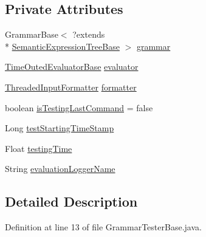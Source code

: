 \subsection*{Private Attributes}
\begin{DoxyCompactItemize}
\item 
Grammar\-Base$<$ ?extends \\*
\hyperlink{interfaceit_1_1emarolab_1_1cagg_1_1core_1_1evaluation_1_1semanticGrammar_1_1syntaxCompiler_1_1SemanticExpressionTreeBase}{Semantic\-Expression\-Tree\-Base} $>$ \hyperlink{classit_1_1emarolab_1_1cagg_1_1core_1_1evaluation_1_1interfacing_1_1GrammarTesterBase_ac6601808f37ef4327e6308143f01dc6a}{grammar}
\item 
\hyperlink{classit_1_1emarolab_1_1cagg_1_1core_1_1evaluation_1_1interfacing_1_1TimeOutedEvaluatorBase}{Time\-Outed\-Evaluator\-Base} \hyperlink{classit_1_1emarolab_1_1cagg_1_1core_1_1evaluation_1_1interfacing_1_1GrammarTesterBase_a51c86bbb5b066f7baeecea125a33f879}{evaluator}
\item 
\hyperlink{classit_1_1emarolab_1_1cagg_1_1core_1_1evaluation_1_1inputFormatting_1_1ThreadedInputFormatter}{Threaded\-Input\-Formatter} \hyperlink{classit_1_1emarolab_1_1cagg_1_1core_1_1evaluation_1_1interfacing_1_1GrammarTesterBase_a75f3a37db0c23ff1d1f29df7424fe9e4}{formatter}
\item 
boolean \hyperlink{classit_1_1emarolab_1_1cagg_1_1core_1_1evaluation_1_1interfacing_1_1GrammarTesterBase_ad1a8c5550fc3e8dd84d1d2360b85e624}{is\-Testing\-Last\-Command} = false
\item 
Long \hyperlink{classit_1_1emarolab_1_1cagg_1_1core_1_1evaluation_1_1interfacing_1_1GrammarTesterBase_a5738ac2ae4bd5d8e75a27fa9b38a3a4a}{test\-Starting\-Time\-Stamp}
\item 
Float \hyperlink{classit_1_1emarolab_1_1cagg_1_1core_1_1evaluation_1_1interfacing_1_1GrammarTesterBase_a2ed2bbc3a9d77263932880d044abe9dc}{testing\-Time}
\item 
String \hyperlink{classit_1_1emarolab_1_1cagg_1_1core_1_1evaluation_1_1interfacing_1_1GrammarTesterBase_a298f9b5348b0137acf468502e1344d07}{evaluation\-Logger\-Name}
\end{DoxyCompactItemize}


\subsection{Detailed Description}


Definition at line 13 of file Grammar\-Tester\-Base.\-java.



